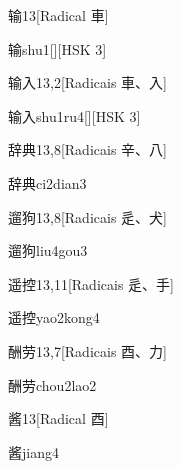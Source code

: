 \begin{entry}{输}{13}[Radical ⾞]
  \begin{phonetics}{输}{shu1}[][HSK 3]
  \end{phonetics}
\end{entry}

\begin{entry}{输入}{13,2}[Radicais ⾞、⼊]
  \begin{phonetics}{输入}{shu1ru4}[][HSK 3]
  \end{phonetics}
\end{entry}

\begin{entry}{辞典}{13,8}[Radicais ⾟、⼋]
  \begin{phonetics}{辞典}{ci2dian3}
  \end{phonetics}
\end{entry}

\begin{entry}{遛狗}{13,8}[Radicais ⾡、⽝]
  \begin{phonetics}{遛狗}{liu4gou3}
  \end{phonetics}
\end{entry}

\begin{entry}{遥控}{13,11}[Radicais ⾡、⼿]
  \begin{phonetics}{遥控}{yao2kong4}
  \end{phonetics}
\end{entry}

\begin{entry}{酬劳}{13,7}[Radicais ⾣、⼒]
  \begin{phonetics}{酬劳}{chou2lao2}
  \end{phonetics}
\end{entry}

\begin{entry}{酱}{13}[Radical ⾣]
  \begin{phonetics}{酱}{jiang4}
  \end{phonetics}
\end{entry}

